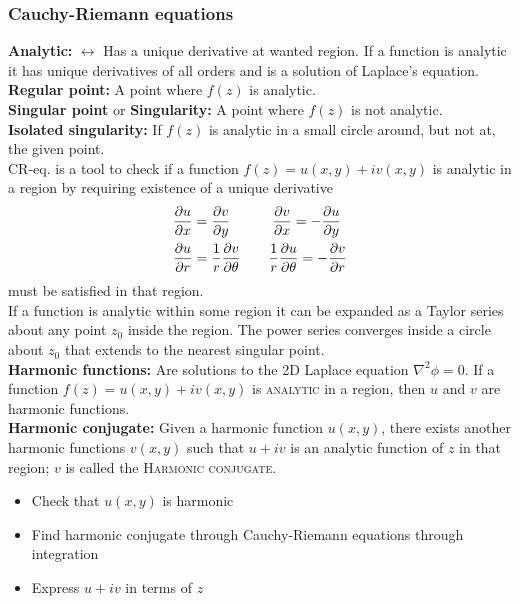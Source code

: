\documentclass[a4paper, 10pt]{article}
\begin{document}
\begin{multicols*}{3}
\subsubsection*{Cauchy-Riemann equations}
\textbf{Analytic:} $\leftrightarrow$ Has a unique derivative at wanted region. If a function is analytic it has unique derivatives of all orders and is a solution of Laplace's equation.\\
\textbf{Regular point:} A point where $f(z)$ is analytic.\\
\textbf{Singular point} or \textbf{Singularity:} A point where $f(z)$ is not analytic.\\
\textbf{Isolated singularity:} If $f(z)$ is analytic in a small circle around, but not at, the given point.\\
CR-eq. is a tool to check if a function $f(z) = u(x,y) +iv(x,y)$ is analytic in a region by requiring existence of a unique derivative
\begin{align*}
  \pdv{u}{x} &= \pdv{v}{y} \qquad\quad \pdv{v}{x} = - \pdv{u}{y} \\
  \pdv{u}{r} &= \frac{1}{r}\pdv{v}{\theta} \qquad \frac{1}{r}\pdv{u}{\theta} = - \pdv{v}{r}
\end{align*}
must be satisfied in that region.\\
If a function is analytic within some region it can be expanded as a Taylor series about any point $z_0$ inside the region. The power series converges inside a circle about $z_0$ that extends to the nearest singular point.\\
\textbf{Harmonic functions:} Are solutions to the 2D Laplace equation $\nabla^2\phi = 0$. If a function $f(z) = u(x,y) +iv(x,y)$ is \textsc{analytic} in a region, then $u$ and $v$ are harmonic functions.\\
\textbf{Harmonic conjugate:} Given a harmonic function $u(x,y)$, there exists another harmonic functions $v(x,y)$ such that $u+iv$ is an analytic function of $z$ in that region; $v$ is called the \textsc{Harmonic conjugate}.
\begin{itemize}
  \item Check that $u(x,y)$ is harmonic
  \item Find harmonic conjugate through Cauchy-Riemann equations through integration
  \item Express $u+iv$ in terms of $z$
\end{itemize}

\end{multicols*}
\end{document}
